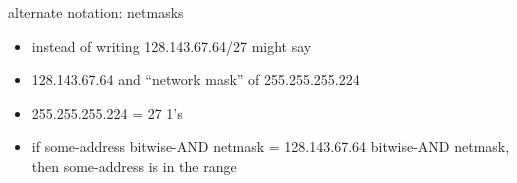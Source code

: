 \begin{frame}{alternate notation: netmasks}
    \begin{itemize}
    \item instead of writing 128.143.67.64/27 might say
    \item 128.143.67.64 and ``network mask'' of 255.255.255.224
    \item 255.255.255.224 = 27 1's
    \vspace{.5cm}
    \item<2-> if some-address bitwise-AND netmask = 128.143.67.64 bitwise-AND netmask, \\
        then some-address is in the range
    \end{itemize}
\end{frame}
